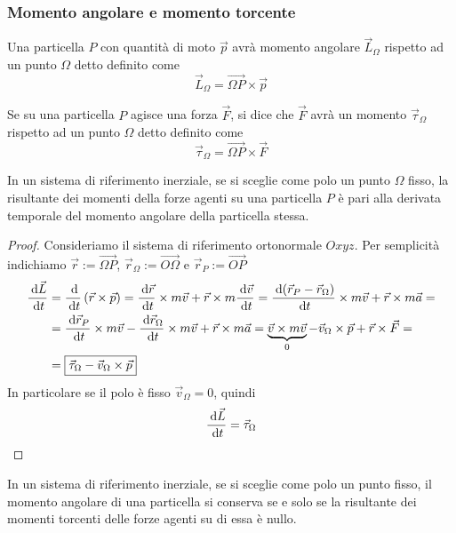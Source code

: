 \documentclass{article}
\theoremstyle{plain}
\begin{document}
\subsubsection{Momento angolare e momento torcente}
\begin{boxdef}
     Una particella $P$ con quantità di moto $\vec p$ avrà momento angolare $\vec L_\Omega$ rispetto ad un punto $\Omega$ detto  definito come
     \[\vec L_{\Omega} = \overrightarrow{\Omega P}\times \vec p\]
\end{boxdef}

\begin{boxdef}
    Se su una particella $P$ agisce una forza $\vec F$, si dice che $\vec F$ avrà un momento $\vec \tau_\Omega$ rispetto ad un punto $\Omega$ detto  definito come
    \[\vec \tau_{\Omega} = \overrightarrow{\Omega P}\times \vec F\]
\end{boxdef}
\begin{shadedTheorem}
    In un sistema di riferimento inerziale, se si sceglie come polo un punto $\Omega$ fisso, la risultante dei momenti della forze agenti su una particella $P$ è pari alla derivata temporale del momento angolare della particella stessa.
\end{shadedTheorem}
\begin{proof}
    Consideriamo il sistema di riferimento ortonormale $Oxyz$. Per semplicità indichiamo $\vec r:= \overrightarrow{\Omega P}$, $\vec r_{\Omega}:= \overrightarrow{O\Omega}$ e $\vec r_{P}:= \overrightarrow{OP}$
    \[
    \begin{aligned}
        \frac{\:\text{d} \vec L}{\:\text{d} t} &= \frac{\:\text{d}}{\:\text{d} t}\left( \vec r\times \vec p \right) = \frac{\:\text{d} \vec r}{\:\text{d} t} \times m \vec v + \vec r \times m\frac{\:\text{d} \vec v}{\:\text{d} t} = \frac{\:\text{d} (\vec r_P -\vec r_\Omega)}{\:\text{d} t} \times m \vec v + \vec r \times m\vec a = \\& = \frac{\:\text{d}\vec r_P}{\:\text{d} t} \times m \vec v - \frac{\:\text{d} \vec r_\Omega}{\:\text{d} t} \times m \vec v + \vec r \times m\vec a = \underbrace{\vec v \times m\vec v}_0 - \vec v_\Omega \times \vec p +\vec r \times \vec F = \\ &=\boxed{\vec \tau_{\Omega} - \vec v_\Omega \times \vec p}
    \end{aligned}\]
    In particolare se il polo è fisso $\vec v_\Omega=0$, quindi \[\frac{\:\text{d} \vec L}{\:\text{d} t} = \vec \tau_{\Omega}\]
\end{proof}
\begin{corollary*}
    In un sistema di riferimento inerziale, se si sceglie come polo un punto fisso, il momento angolare di una particella si conserva se e solo se la risultante dei momenti torcenti delle forze agenti su di essa è nullo.
\end{corollary*}
\end{document}
